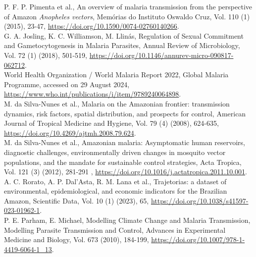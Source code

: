 \documentclass[a4paper,fleqn]{cas-dc}
\begin{document}
 \begin{thebibliography}{00}


 P. F. P. Pimenta et al., An overview of malaria transmission from the perspective of Amazon \emph{Anopheles vectors}, Memórias do Instituto Oswaldo Cruz, Vol. 110 (1) (2015), 23-47, \href{https://doi.org/10.1590/0074-02760140266}{https://doi.org/10.1590/0074-02760140266}.
\\
 G. A. Josling, K. C. Williamson, M. Llinás, Regulation of Sexual Commitment and Gametocytogenesis in Malaria Parasites, Annual Review of Microbiology, Vol. 72 (1) (2018), 501-519, \href{https://doi.org/10.1146/annurev-micro-090817-062712}{https://doi.org/10.1146/annurev-micro-090817-062712}.
\\
 World Health Organization / World Malaria Report 2022, Global Malaria Programme, accessed on 29 August 2024, \href{https://www.who.int/publications/i/item/9789240064898}{https://www.who.int/publications/i/item/9789240064898}.
\\
 M. da Silva-Nunes et al., Malaria on the Amazonian frontier: transmission dynamics, risk factors, spatial distribution, and prospects for control, American Journal of Tropical Medicine and Hygiene, Vol. 79 (4) (2008), 624-635, \href{https://doi.org/10.4269/ajtmh.2008.79.624}{https://doi.org/10.4269/ajtmh.2008.79.624}. 
\\
 M. da Silva-Nunes et al.,  Amazonian malaria: Asymptomatic human reservoirs, diagnostic challenges, environmentally driven changes in mosquito vector populations, and the mandate for sustainable control strategies, Acta Tropica, Vol. 121 (3) (2012), 281-291 , \href{https://doi.org/10.1016/j.actatropica.2011.10.001}{https://doi.org/10.1016/j.actatropica.2011.10.001}.
\\
 A. C. Rorato, A. P. Dal’Asta, R. M. Lana et al., Trajetorias: a dataset of environmental, epidemiological, and economic indicators for the Brazilian Amazon, Scientific Data, Vol. 10 (1) (2023), 65, \href{https://doi.org/10.1038/s41597-023-01962-1}{https://doi.org/10.1038/s41597-023-01962-1}.
\\
 P. E. Parham, E. Michael, Modelling Climate Change and Malaria Transmission, Modelling Parasite Transmission and Control, Advances in Experimental Medicine and Biology, Vol. 673 (2010), 184-199, \href{https://doi.org/10.1007/978-1-4419-6064-1_13}{https://doi.org/10.1007/978-1-4419-6064-1\_13}.

\end{thebibliography}
\end{document}
